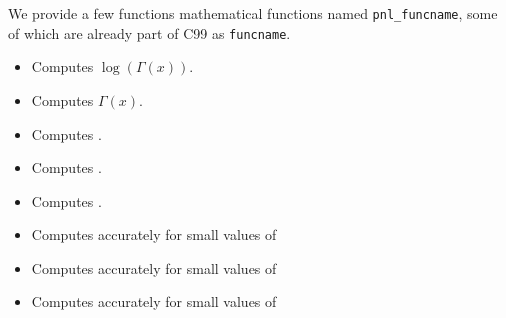 We provide a few functions mathematical functions named \verb+pnl_funcname+,
some of which are already part of C99 as \verb+funcname+.
\begin{itemize}
  \item {}
    \sshortdescribe Computes $\log(\Gamma(x))$.
  \item {}
    \sshortdescribe Computes $\Gamma(x)$.
  \item {}
    \sshortdescribe Computes .
  \item {}
    \sshortdescribe Computes .
  \item {}
    \sshortdescribe Computes .
  \item {}
    \sshortdescribe Computes  accurately for small values of 
  \item {}
    \sshortdescribe Computes  accurately for small values of 
  \item {}
    \sshortdescribe Computes  accurately for small values of 
\end{itemize}

